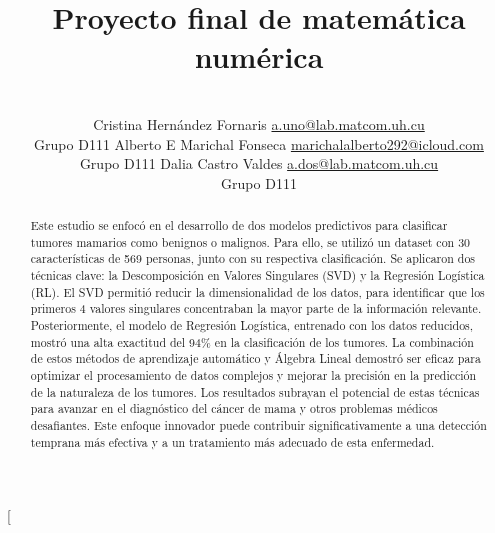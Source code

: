 \documentclass[a4paper,10pt,twocolumn]{article}
\title{Proyecto final de matemática numérica}
\author{\\
\name Cristina Hernández Fornaris \email \href{mailto:a.uno@lab.matcom.uh.cu}{a.uno@lab.matcom.uh.cu}
	\\ \addr Grupo D111 \AND
\name Alberto E Marichal Fonseca \email \href{marichalalberto292@icloud.com}{marichalalberto292@icloud.com}
  \\ \addr Grupo D111\AND
\name Dalia Castro Valdes \email \href{mailto:a.dos@lab.matcom.uh.cu}{a.dos@lab.matcom.uh.cu}
  \\ \addr Grupo D111}
\begin{document}
\twocolumn[

\maketitle


\begin{abstract}

	Este estudio se enfocó en el desarrollo de dos modelos predictivos para clasificar tumores mamarios como benignos o malignos. Para ello, se utilizó un dataset con 30 características de 569 personas, junto con su respectiva clasificación. Se aplicaron dos técnicas clave: la Descomposición en Valores Singulares (SVD) y la Regresión Logística (RL). El SVD permitió reducir la dimensionalidad de los datos, para identificar que los primeros 4 valores singulares concentraban la mayor parte de la información relevante. Posteriormente, el modelo de Regresión Logística, entrenado con los datos reducidos, mostró una alta exactitud del 94\% en la clasificación de los tumores. La combinación de estos métodos de aprendizaje automático y Álgebra Lineal demostró ser eficaz para optimizar el procesamiento de datos complejos y mejorar la precisión en la predicción de la naturaleza de los tumores. Los resultados subrayan el potencial de estas técnicas para avanzar en el diagnóstico del cáncer de mama y otros problemas médicos desafiantes. Este enfoque innovador puede contribuir significativamente a una detección temprana más efectiva y a un tratamiento más adecuado de esta enfermedad.

\end{abstract}

\vspace{0.5cm}
\end{document}
